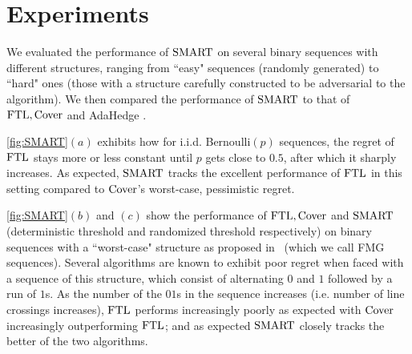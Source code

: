 \section{Experiments}

We evaluated the performance of $\text{SMART}$ on several binary sequences with different structures, ranging from ``easy" sequences (randomly generated) to ``hard" ones (those with a structure carefully constructed to be adversarial to the algorithm). We then compared the performance of $\text{SMART}$ to that of $\text{FTL}, \text{Cover}$ and AdaHedge \citep{de2014follow}. 

\cref{fig:SMART}$(a)$ exhibits how for i.i.d. Bernoulli$(p)$ sequences, the regret of $\text{FTL}$ stays more or less constant until $p$ gets close to $0.5$, after which it sharply increases. As expected, $\text{SMART}$ tracks the excellent performance of $\text{FTL}$ in this setting compared to $\text{Cover}$'s worst-case, pessimistic regret. 

\cref{fig:SMART}$(b)$ and $(c)$ show the performance of $\text{FTL}, \text{Cover}$ and $\text{SMART}$ (deterministic threshold and randomized threshold respectively) on binary sequences with a ``worst-case" structure as proposed in~\cite{feder1992universal} (which we call FMG sequences). Several algorithms are known to exhibit poor regret when faced with a sequence of this structure, which consist of alternating $0$ and $1$ followed by a run of $1$s. As the number of the $01$s in the sequence increases (i.e. number of line crossings increases), $\text{FTL}$ performs increasingly poorly as expected with $\text{Cover}$ increasingly outperforming $\text{FTL}$; and as expected $\text{SMART}$ closely tracks the better of the two algorithms.  

